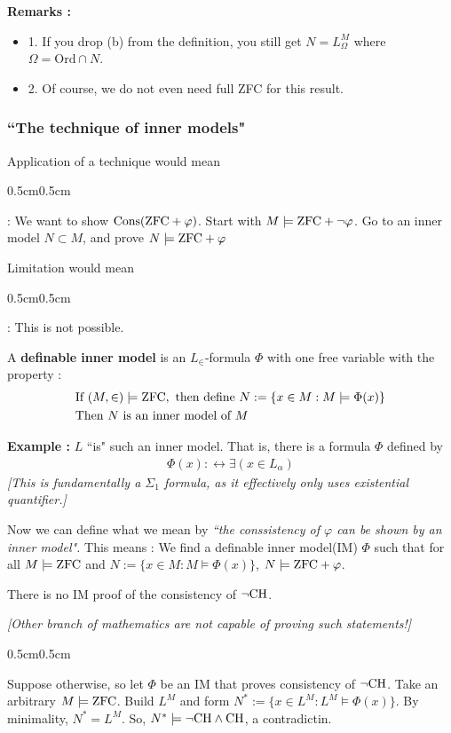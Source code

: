 \documentclass[12pt,a4paper]{article}
\newenvironment{proof}
{\begin{changemargin}{0.5cm}{0.5cm} 
	}%
	{\end{changemargin}
}
\newenvironment{subproof}
{\begin{changemargin}{0.5cm}{0.5cm} 
	}%
	{\end{changemargin}
}
\renewenvironment{i}
{\begin{itemize} 
	}%
	{\end{itemize}
}
\newenvironment{p}
{\begin{proof} 
	}%
	{\end{proof}
}
\begin{document}
\textbf{Remarks :}
\begin{i}
\item[1.] If you drop (b) from the definition, you still get $N = L_{\Omega}^M$ where $\Omega = \text{Ord} \cap N$.
\item[2.] Of course, we do not even need full ZFC for this result.
\end{i}
\s

\subsubsection*{``The technique of inner models"}

Application of a technique would mean
\begin{subproof}
: We want to show $\text{Cons} (\text{ZFC} + \varphi)$. Start with $M \models \text{ZFC} + \neg \varphi$. Go to an inner model $N\subset M$, and prove $N \models \text{ZFC} + \varphi$
\end{subproof}
Limitation would mean
\begin{subproof}
: This is not possible.
\end{subproof}
\s

 A \textbf{definable inner model} is an $L_{\in}$-formula $\Phi$ with one free variable with the property :
\begin{align*}
&\text{If } (M, \in) \models \text{ZFC}, \text{ then define } N:= \{x\in M : M \models \Phi(x) \} \\
&\text{Then } N \text{ is an inner model of }M
\end{align*}
\s

\textbf{Example :} $L$ ``is" such an inner model. That is, there is a formula $\Phi$ defined by
\begin{align*}
\Phi(x) :\leftrightarrow \exists (x\in L_{\alpha})
\end{align*}
\emph{[This is fundamentally a $\Sigma_1$ formula, as it effectively only uses existential quantifier.]}
\s

Now we can define what we mean by \emph{``the conssistency of $\varphi$ can be shown by an inner model".} This means : We find a definable inner model(IM) $\Phi$ such that for all $M\models \text{ZFC}$ and $N:= \{x\in M : M\models \Phi(x) \}$, $N\models \text{ZFC} + \varphi$.
\s

\corr There is no IM proof of the consistency of $\neg \text{CH}$.

\emph{[Other branch of mathematics are not capable of proving such statements!]}
\begin{p}
\pf Suppose otherwise, so let $\Phi$ be an IM that proves consistency of $\neg \text{CH}$. Take an arbitrary $M\models \text{ZFC}$. Build $L^M$ and form $N^* := \{x\in L^M : L^M \models \Phi(x)\}$. By minimality, $N^* = L^M$. So, $N^* \models \neg \text{CH} \wedge \text{CH}$, a contradictin.

\eop
\end{p}
\s
\end{document}
